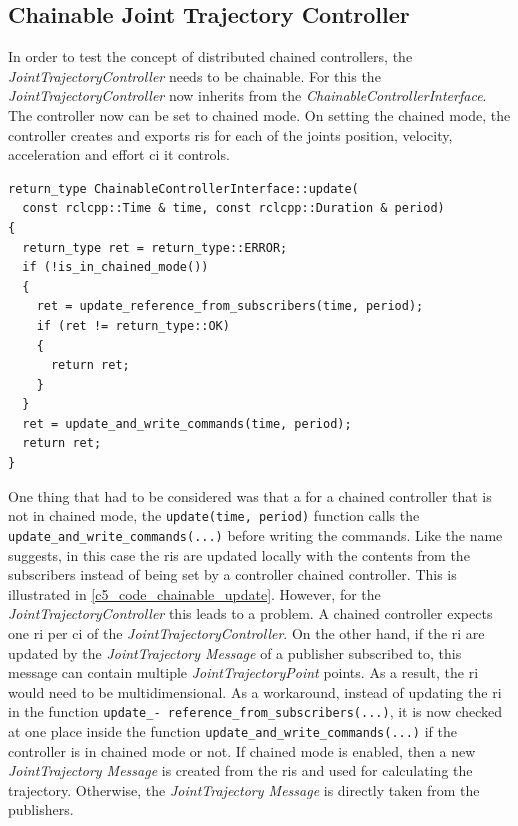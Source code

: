 \subsection{Chainable Joint Trajectory Controller}
In order to test the concept of distributed chained controllers, the \textit{JointTrajectoryController} needs to be chainable. For this the \textit{JointTrajectoryController} now inherits from the \textit{ChainableControllerInterface}. The controller now can be set to chained mode. On setting the chained mode, the controller creates and exports \glspl{ri} for each of the joints position, velocity, acceleration and effort \gls{ci} it controls.\newline
\lstset{language=C++,basicstyle=\small}
\begin{lstlisting}[caption=Update function for \textit{ChainableControllerInterface}.,label=c5_code_chainable_update]
return_type ChainableControllerInterface::update(
  const rclcpp::Time & time, const rclcpp::Duration & period)
{
  return_type ret = return_type::ERROR;
  if (!is_in_chained_mode())
  {
    ret = update_reference_from_subscribers(time, period);
    if (ret != return_type::OK)
    {
      return ret;
    }
  }
  ret = update_and_write_commands(time, period);
  return ret;
}
\end{lstlisting}
One thing that had to be considered was that a for a chained controller that is not in chained mode, the \lstset{language=C++,basicstyle=\small\ttfamily}\lstinline{update(time, period)} function calls the \lstset{language=C++,basicstyle=\small\ttfamily}\lstinline{update_and_write_commands(...)} before writing the commands. Like the name suggests, in this case the \glspl{ri} are updated locally with the contents from the subscribers instead of being set by a controller chained controller. This is illustrated in \autoref{c5_code_chainable_update}. However, for the \textit{JointTrajectoryController} this leads to a problem. A chained controller expects one \gls{ri} per \gls{ci} of the \textit{JointTrajectoryController}. On the other hand, if the \gls{ri} are updated by the \textit{JointTrajectory Message} of a publisher subscribed to, this message can contain multiple \textit{JointTrajectoryPoint} points. As a result, the \gls{ri} would need to be multidimensional. \newline
As a workaround, instead of updating the \gls{ri} in the function \lstset{language=C++,basicstyle=\small\ttfamily, breaklines=true}\lstinline{update_- reference_from_subscribers(...)}, it is now checked at one place inside the function \lstset{language=C++,basicstyle=\small\ttfamily}\lstinline{update_and_write_commands(...)} if the controller is in chained mode or not. If chained mode is enabled, then a new \textit{JointTrajectory Message} is created from the \glspl{ri} and used for calculating the trajectory. Otherwise, the \textit{JointTrajectory Message} is directly taken from the publishers.

